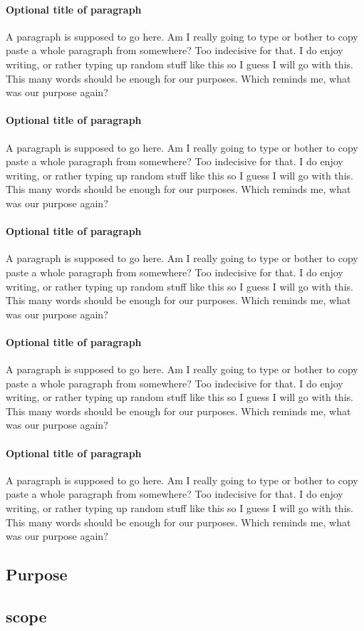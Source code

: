 \documentclass{article}
\begin{document}
	\paragraph{Optional title of paragraph}
	A paragraph is supposed to go here. Am I really going to type or bother to copy paste a whole paragraph from somewhere? Too indecisive for that. I do enjoy writing, or rather typing up random stuff like this so I guess I will go with this. This many words should be enough for our purposes. Which reminds me, what was our purpose again?

	\paragraph{Optional title of paragraph}
	A paragraph is supposed to go here. Am I really going to type or bother to copy paste a whole paragraph from somewhere? Too indecisive for that. I do enjoy writing, or rather typing up random stuff like this so I guess I will go with this. This many words should be enough for our purposes. Which reminds me, what was our purpose again?

	\paragraph{Optional title of paragraph}
	A paragraph is supposed to go here. Am I really going to type or bother to copy paste a whole paragraph from somewhere? Too indecisive for that. I do enjoy writing, or rather typing up random stuff like this so I guess I will go with this. This many words should be enough for our purposes. Which reminds me, what was our purpose again?

	\paragraph{Optional title of paragraph}
	A paragraph is supposed to go here. Am I really going to type or bother to copy paste a whole paragraph from somewhere? Too indecisive for that. I do enjoy writing, or rather typing up random stuff like this so I guess I will go with this. This many words should be enough for our purposes. Which reminds me, what was our purpose again?

	\paragraph{Optional title of paragraph}
	A paragraph is supposed to go here. Am I really going to type or bother to copy paste a whole paragraph from somewhere? Too indecisive for that. I do enjoy writing, or rather typing up random stuff like this so I guess I will go with this. This many words should be enough for our purposes. Which reminds me, what was our purpose again?

	\subsection{Purpose}

	\subsection{scope}
\end{document}
